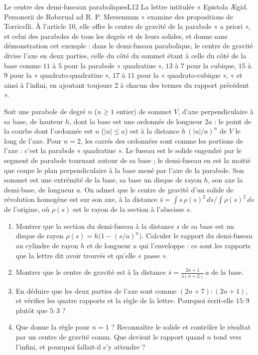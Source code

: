 \documentclass[11pt,a4paper]{article}
\begin{document}
\begin{exercice}{Le centre des demi-fuseaux paraboliques}{L1}{2}
La lettre intitulée « Epistola Ægid. Personerii de Roberual ad R. P. Mersennum »
examine des propositions de Torricelli. À l'article 10, elle offre le centre de
gravité de la parabole « a priori », et celui des paraboles de tous les degrés et
de leurs solides, et donne sans démonstration cet exemple : dans le demi-fuseau
parabolique, le centre de gravité divise l'axe en deux parties, celle du côté du
sommet étant à celle du côté de la base comme $11$ à $5$ pour la parabole
« quadratiue », $13$ à $7$ pour la cubique, $15$ à $9$ pour la
« quadrato-quadratiue », $17$ à $11$ pour la « quadrato-cubique », « et ainsi à
l'infini, en ajoutant toujours 2 à chacun des termes du rapport précédent ».

Soit une parabole de degré $n$ ($n \ge 1$ entier) de sommet $V$, d'axe
perpendiculaire à sa base, de hauteur $h$, dont la base est une ordonnée de
longueur $2a$ : le point de la courbe dont l'ordonnée est $u$ ($|u| \le a$) est à
la distance $h\,(|u|/a)^n$ de $V$ le long de l'axe. Pour $n = 2$, les carrés des
ordonnées sont comme les portions de l'axe : c'est la parabole « quadratiue ». Le
fuseau est le solide engendré par le segment de parabole tournant autour de sa
base ; le demi-fuseau en est la moitié que coupe le plan perpendiculaire à la base
mené par l'axe de la parabole. Son sommet est une extrémité de la base, sa base un
disque de rayon $h$, son axe la demi-base, de longueur $a$. On admet que le centre
de gravité d'un solide de révolution homogène est sur son axe, à la distance
$\bar s = \int s\,\rho(s)^2\,ds \big/ \int \rho(s)^2\,ds$ de l'origine, où $\rho(s)$
est le rayon de la section à l'abscisse $s$.


\begin{enumerate}
\item Montrer que la section du demi-fuseau à la distance $s$ de sa base est un
  disque de rayon $\rho(s) = h\bigl(1 - (s/a)^n\bigr)$. Calculer le rapport du
  demi-fuseau au cylindre de rayon $h$ et de longueur $a$ qui l'enveloppe : ce sont
  les rapports que la lettre dit avoir trouvés et qu'elle « passe ».
\item Montrer que le centre de gravité est à la distance
  $\bar s = \frac{2n + 1}{4(n + 2)}\,a$ de la base.
\item En déduire que les deux parties de l'axe sont comme $(2n + 7) : (2n + 1)$, et
  vérifier les quatre rapports et la règle de la lettre. Pourquoi écrit-elle
  $15 : 9$ plutôt que $5 : 3$ ?
\item Que donne la règle pour $n = 1$ ? Reconnaître le solide et contrôler le
  résultat par un centre de gravité connu. Que devient le rapport quand $n$ tend
  vers l'infini, et pourquoi fallait-il s'y attendre ?
\end{enumerate}
\end{exercice}
\end{document}
